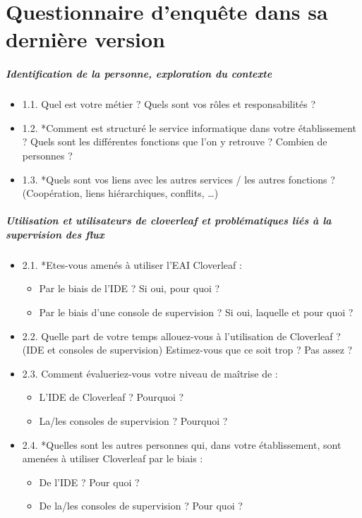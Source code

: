 \chapter{Questionnaire d'enquête dans sa dernière version}
	\paragraph{Identification de la personne, exploration du contexte}
	\begin{itemize}
	  \item 1.1. Quel est votre métier ? Quels sont vos rôles et responsabilités ?
	  \item 1.2. *Comment est structuré le service informatique dans votre
	  établissement ? Quels sont les différentes fonctions que l’on y retrouve ? Combien de personnes ?
	  \item 1.3. *Quels sont vos liens avec les autres services / les autres
	  fonctions ? (Coopération, liens hiérarchiques, conflits, …)
	\end{itemize}
	
	\paragraph{Utilisation et utilisateurs de cloverleaf et problématiques liés à la
	supervision des flux}
	\begin{itemize}
	  \item 2.1. *Etes-vous amenés à utiliser l’EAI Cloverleaf :
	  	\begin{itemize}
	  	  \item Par le biais de l’IDE ? Si oui, pour quoi ?
	  	  \item Par le biais d’une console de supervision ? Si oui, laquelle et pour
	  	  quoi ?
	  	\end{itemize}
	   \item 2.2. Quelle part de votre temps allouez-vous à l’utilisation de
	   Cloverleaf ? (IDE et consoles de supervision) Estimez-vous que ce soit trop ? Pas assez ?
	   \item 2.3. Comment évalueriez-vous votre niveau de maîtrise de :
	   	\begin{itemize}
	  	  \item L’IDE de Cloverleaf ? Pourquoi ?
	  	  \item La/les consoles de supervision ? Pourquoi ?
	  	\end{itemize}
	   \item 2.4. *Quelles sont les autres personnes qui, dans votre établissement,
	   sont amenées à utiliser Cloverleaf par le biais :
	   	\begin{itemize}
	  	  \item De l’IDE ? Pour quoi ?
	  	  \item De la/les consoles de supervision ? Pour quoi ?
	  	\end{itemize}
	\end{itemize}
	

